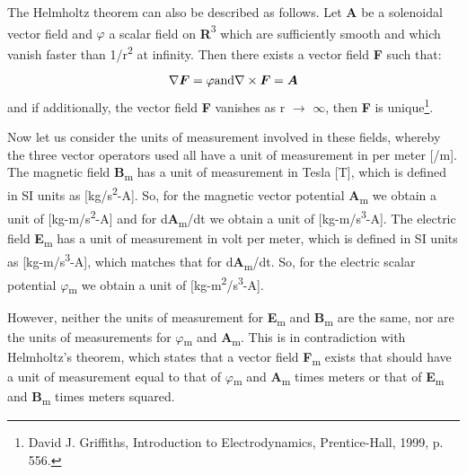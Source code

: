 \documentclass[a4paper]{article}
\newcommand\textstyleNone[1]{#1}
\newcommand\boldsubformula[1]{\text{\mathversion{bold}$#1$}}
\begin{document}
{
\textstyleNone{{The Helmholtz theorem can also be described as
follows. Let
}\textbf{{A}}{
be a solenoidal vector field and }{$\varphi
$}{ }{a scalar
field on
}\textbf{{R}}{\textsuperscript{3}}{
which are sufficiently smooth and which vanish faster than
}{1/r}{\textsuperscript{2}}{
at infinity. Then there exists a vector field
}\textbf{{F}}{
such that:}}}

\begin{equation}
\nabla \boldsubformula F=\varphi \text{and}\nabla \times \boldsubformula F=\boldsubformula A
\end{equation}
{
\textstyleNone{{and if additionally, the vector field
}\textbf{{F}}{
vanishes as r $\rightarrow $ ${\infty}$, then
}\textbf{{F}}{
is unique}}\footnote{ David J. Griffiths, Introduction to Electrodynamics, Prentice-Hall, 1999, p. 556.\par
}\textstyleNone{{.}}}

{
\textstyleNone{{Now let us consider the units of measurement
involved in these fields, whereby the three vector operators used all have a unit of measurement in per meter [/m]. The
magnetic field
}\textbf{{B}}{\textsubscript{m}}{
has a unit of measurement in Tesla [T], which is defined in SI units as
[kg/s}{\textsuperscript{2}}{{}-A].
So, for the magnetic vector potential
}\textbf{{A}}{\textsubscript{m}}{
we obtain a unit of
[kg-m/s}{\textsuperscript{2}}{{}-A]
and for
}{d}\textbf{{A}}{\textsubscript{m}}{/dt}{
we obtain a unit of
[kg-m/s}{\textsuperscript{3}}{{}-A].
The electric field
}\textbf{{E}}{\textsubscript{m}}{
has a unit of measurement in volt per meter, which is defined in SI units as
[kg-m/s}{\textsuperscript{3}}{{}-A],
which matches that for
}{d}\textbf{{A}}{\textsubscript{m}}{/dt}{.
So, for the electric scalar potential }{$\varphi
$}{\textsubscript{m}}{
we obtain a unit of
}{[kg-m}{\textsuperscript{2}}{/s}{\textsuperscript{3}}{{}-A].}}}

{
\textstyleNone{{However, neither the units of measurement for
}\textbf{{E}}{\textsubscript{m}}{
and
}\textbf{{B}}{\textsubscript{m}}{
are the same, nor are the units of measurements for }{$\varphi
$}{\textsubscript{m}}{
and
}\textbf{{A}}{\textsubscript{m}}{.
This is in contradiction with Helmholtz's theorem, which states that a vector field
}\textbf{{F}}{\textsubscript{m}}{
exists that should have a unit of measurement equal to that of
}{$\varphi
$}{\textsubscript{m}}{
and
}\textbf{{A}}{\textsubscript{m}}{
times meters or that of
}\textbf{{E}}{\textsubscript{m}}{
and
}\textbf{{B}}{\textsubscript{m}}{
times meters squared.}}}
\end{document}

